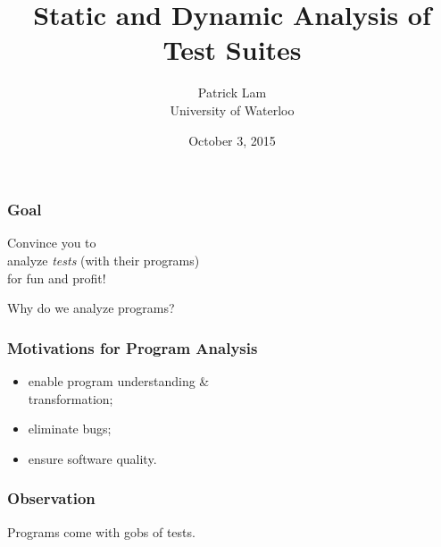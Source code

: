 \documentclass{beamer}
\title{Static and Dynamic Analysis of Test Suites}
\author{Patrick Lam\\University of Waterloo}
\date{October 3, 2015}
\newenvironment{changemargin}[1]{%
  \begin{list}{}{%
    \setlength{\topsep}{0pt}%
    \setlength{\leftmargin}{#1}%
    \setlength{\rightmargin}{1em}
    \setlength{\listparindent}{\parindent}%
    \setlength{\itemindent}{\parindent}%
    \setlength{\parsep}{\parskip}%
  }%
  \item[]}{\end{list}}
\begin{document}
\begin{frame}
  \titlepage
\end{frame}

\begin{frame}
  \frametitle{Goal}
  \Large
\begin{center}
Convince you to \\ analyze \emph{tests} (with their programs) \\ 
for fun and profit!
\end{center}
\end{frame}


\begin{frame}
  \centering
  \LARGE
  Why do we analyze programs?
\end{frame}

\begin{frame}
  \frametitle{Motivations for Program Analysis}
  \Large
  \begin{changemargin}{1cm}
    \begin{itemize}
    \item enable program understanding \& \\
 \hspace*{2em} transformation;
    \item eliminate bugs;
    \item ensure software quality.
    \end{itemize}
  \end{changemargin}
\end{frame}


\begin{frame}
  \frametitle{Observation}
  \centering
  \LARGE Programs come with gobs of tests.
\end{frame}
\end{document}
